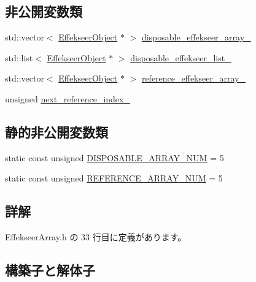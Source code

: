 \subsection*{非公開変数類}
\begin{DoxyCompactItemize}
\item 
std\+::vector$<$ \mbox{\hyperlink{class_effekseer_object}{Effekseer\+Object}} $\ast$ $>$ \mbox{\hyperlink{class_effekseer_array_afe05ea57a5b118100a40a32374a9df32}{disposable\+\_\+effekseer\+\_\+array\+\_\+}}
\item 
std\+::list$<$ \mbox{\hyperlink{class_effekseer_object}{Effekseer\+Object}} $\ast$ $>$ \mbox{\hyperlink{class_effekseer_array_ac6e61bc691a4173f64da8d7c657147f0}{disposable\+\_\+effekseer\+\_\+list\+\_\+}}
\item 
std\+::vector$<$ \mbox{\hyperlink{class_effekseer_object}{Effekseer\+Object}} $\ast$ $>$ \mbox{\hyperlink{class_effekseer_array_ab4fc19ba8c5a587817d9ac202c722f21}{reference\+\_\+effekseer\+\_\+array\+\_\+}}
\item 
unsigned \mbox{\hyperlink{class_effekseer_array_a6f92d34cdcfaac9d0e64db04339832be}{next\+\_\+reference\+\_\+index\+\_\+}}
\end{DoxyCompactItemize}
\subsection*{静的非公開変数類}
\begin{DoxyCompactItemize}
\item 
static const unsigned \mbox{\hyperlink{class_effekseer_array_a60c93a372a378026ae115faa3bbc5a2d}{D\+I\+S\+P\+O\+S\+A\+B\+L\+E\+\_\+\+A\+R\+R\+A\+Y\+\_\+\+N\+UM}} = 5
\item 
static const unsigned \mbox{\hyperlink{class_effekseer_array_aa58d9c8f0e75d233f3bb2a92c3374bbb}{R\+E\+F\+E\+R\+E\+N\+C\+E\+\_\+\+A\+R\+R\+A\+Y\+\_\+\+N\+UM}} = 5
\end{DoxyCompactItemize}


\subsection{詳解}


 Effekseer\+Array.\+h の 33 行目に定義があります。



\subsection{構築子と解体子}
\mbox{\label{class_effekseer_array_ae598c1486d263356b63ba8d08a3afc20}} 
